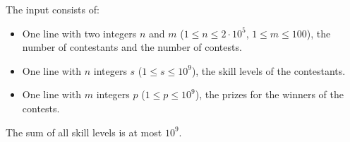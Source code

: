 
    The input consists of:
    \begin{itemize}
        \item One line with two integers $n$ and $m$ ($1\leq n\leq 2\cdot10^5$, $1 \leq m \leq 100$),
              the number of contestants and the number of contests.
        \item One line with $n$ integers $s$ ($1\leq s\leq10^9$),
              the skill levels of the contestants.
        \item One line with $m$ integers $p$ ($1 \leq p \leq 10^9$),
              the prizes for the winners of the contests.
    \end{itemize}
    The sum of all skill levels is at most $10^9$.
